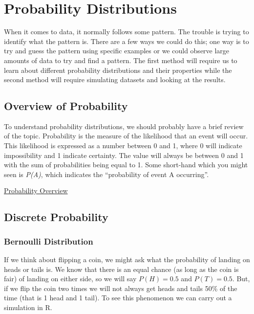 \documentclass[
  letterpaper,
  DIV=11,
  numbers=noendperiod]{scrreprt}
\begin{document}
\chapter{Probability Distributions}\label{probability-distributions}

When it comes to data, it normally follows some pattern. The trouble is
trying to identify what the pattern is. There are a few ways we could do
this; one way is to try and guess the pattern using specific examples or
we could observe large amounts of data to try and find a pattern. The
first method will require us to learn about different probability
distributions and their properties while the second method will require
simulating datasets and looking at the results.

\section{Overview of Probability}\label{overview-of-probability}

To understand probability distributions, we should probably have a brief
review of the topic. Probability is the measure of the likelihood that
an event will occur. This likelihood is expressed as a number between 0
and 1, where 0 will indicate impossibility and 1 indicate certainty. The
value will always be between 0 and 1 with the sum of probabilities being
equal to 1. Some short-hand which you might seen is \emph{P(A)}, which
indicates the ``probability of event A occurring''.

\begin{watch}{}{}
    \href{https://youtu.be/BxHJLWyJWZo}{Probability Overview}
\end{watch}

\section{Discrete Probability}\label{discrete-probability}

\subsection{Bernoulli Distribution}\label{bernoulli-distribution}

If we think about flipping a coin, we might ask what the probability of
landing on heads or tails is. We know that there is an equal chance (as
long as the coin is fair) of landing on either side, so we will say
\(P(H)=0.5\) and \(P(T)=0.5\). But, if we flip the coin two times we
will not always get heads and tails 50\% of the time (that is 1 head and
1 tail). To see this phenomenon we can carry out a simulation in R.
\end{document}
